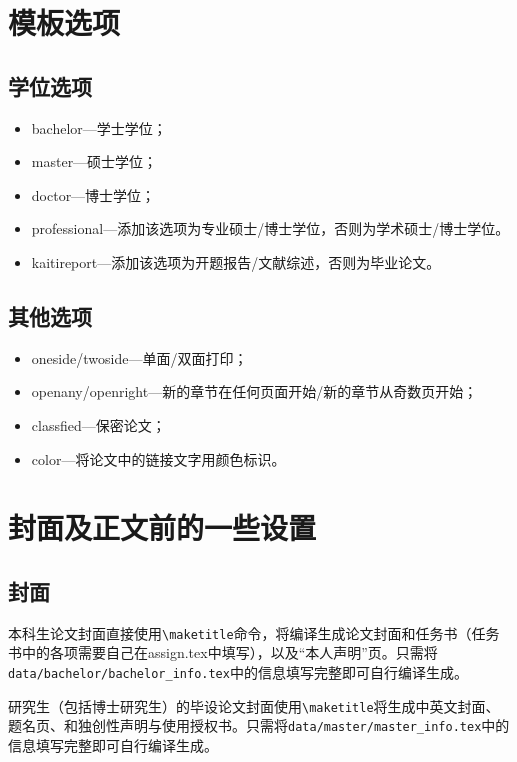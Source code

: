 \section{模板选项}
\subsection{学位选项}
    \begin{itemize}
        \item bachelor---学士学位；
        \item master---硕士学位；
        \item doctor---博士学位；
        \item professional---添加该选项为专业硕士\slash 博士学位，否则为学术硕士\slash 博士学位。
        \item kaitireport---添加该选项为开题报告\slash 文献综述，否则为毕业论文。
    \end{itemize}

\subsection{其他选项}
    \begin{itemize}
        \item oneside\slash twoside---单面\slash 双面打印；
        \item openany\slash openright---新的章节在任何页面开始\slash 新的章节从奇数页开始；
        \item classfied---保密论文；
        \item color---将论文中的链接文字用颜色标识。
    \end{itemize}

\section{封面及正文前的一些设置}
\subsection{封面}
本科生论文封面直接使用\texttt{\textbackslash maketitle}命令，将编译生成论文封面和任务书（任务书中的各项需要自己在assign.tex中填写），以及“本人声明”页。只需将\texttt{data/bachelor/bachelor\_info.tex}中的信息填写完整即可自行编译生成。

研究生（包括博士研究生）的毕设论文封面使用\texttt{\textbackslash maketitle}将生成中英文封面、题名页、和独创性声明与使用授权书。只需将\texttt{data/master/master\_info.tex}中的信息填写完整即可自行编译生成。

